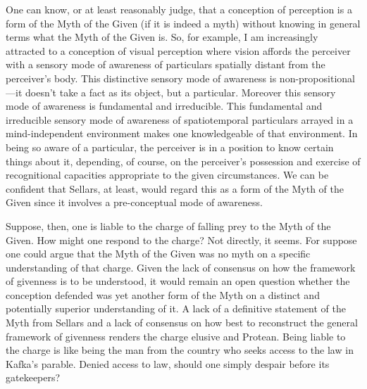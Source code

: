 \documentclass[12pt]{article}
\begin{document}
One can know, or at least reasonably judge, that a conception of perception is a form of the Myth of the Given (if it is indeed a myth) without knowing in general terms what the Myth of the Given is. So, for example, I am increasingly attracted to a conception of visual perception where vision affords the perceiver with a sensory mode of awareness of particulars spatially distant from the perceiver's body. This distinctive sensory mode of awareness is non-propositional---\-it doesn't take a fact as its object, but a particular. Moreover this sensory mode of awareness is fundamental and irreducible. This fundamental and irreducible sensory mode of awareness of spatiotemporal particulars arrayed in a mind-independent environment makes one knowledgeable of that environment. In being so aware of a particular, the perceiver is in a position to know certain things about it, depending, of course, on the perceiver's possession and exercise of recognitional capacities appropriate to the given circumstances. We can be confident that Sellars, at least, would regard this as a form of the Myth of the Given since it involves a pre-conceptual mode of awareness. %

Suppose, then, one is liable to the charge of falling prey to the Myth of the Given. How might one respond to the charge? Not directly, it seems. For suppose one could argue that the Myth of the Given was no myth on a specific understanding of that charge. Given the lack of consensus on how the framework of givenness is to be understood, it would remain an open question whether the conception defended was yet another form of the Myth on a distinct and potentially superior understanding of it. A lack of a definitive statement of the Myth from Sellars and a lack of consensus on how best to reconstruct the general framework of givenness renders the charge elusive and Protean. Being liable to the charge is like being the man from the country who seeks access to the law in Kafka's parable. Denied access to law, should one simply despair before its gatekeepers?
\end{document}
